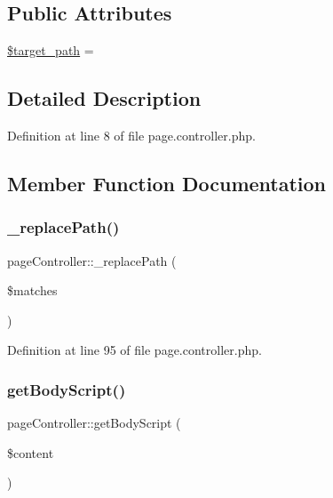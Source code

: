\subsection*{Public Attributes}
\begin{DoxyCompactItemize}
\item 
\hyperlink{classpageController_aad7c7b9ade651130997578967a69a48c}{\$target\+\_\+path} = \textquotesingle{}\textquotesingle{}
\end{DoxyCompactItemize}


\subsection{Detailed Description}


Definition at line 8 of file page.\+controller.\+php.



\subsection{Member Function Documentation}
\mbox{\label{classpageController_abd8a05c83337866bd8e06057c0e6dc4f}} 
\subsubsection{\texorpdfstring{\+\_\+replace\+Path()}{\_replacePath()}}
{\footnotesize\ttfamily page\+Controller\+::\+\_\+replace\+Path (\begin{DoxyParamCaption}\item[{}]{\$matches }\end{DoxyParamCaption})}



Definition at line 95 of file page.\+controller.\+php.

\mbox{\label{classpageController_a8c5c1bd477ffc4beda5af3b6d3cee63f}} 
\subsubsection{\texorpdfstring{get\+Body\+Script()}{getBodyScript()}}
{\footnotesize\ttfamily page\+Controller\+::get\+Body\+Script (\begin{DoxyParamCaption}\item[{}]{\$content }\end{DoxyParamCaption})}



